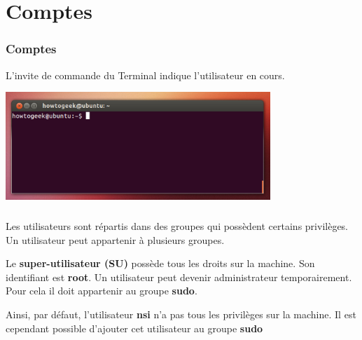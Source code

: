 \documentclass[svgnames,11pt]{beamer}
\begin{document}
\section{Comptes}
\begin{frame}
    \frametitle{Comptes}
    L'invite de commande du Terminal indique l'utilisateur en cours.
    \begin{center}
    \centering
    \includegraphics[width=10cm]{ressources/terminal.png}
    \label{IMG}
    \end{center}

\end{frame}
\begin{frame}
    \frametitle{}

    Les utilisateurs sont répartis dans des groupes qui possèdent certains privilèges. Un utilisateur peut appartenir à plusieurs groupes.
\begin{aretenir}[]
    Le \textbf{super-utilisateur (SU)} possède tous les droits sur la machine. Son identifiant est \textbf{root}. Un utilisateur peut devenir administrateur temporairement. Pour cela il doit appartenir au groupe \textbf{sudo}.
\end{aretenir}

Ainsi, par défaut, l'utilisateur \textbf{nsi} n'a pas tous les privilèges sur la machine. Il est cependant possible d'ajouter cet utilisateur au groupe \textbf{sudo}
\end{frame}
\end{document}
